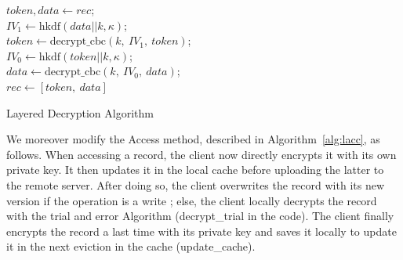 \documentclass[USenglish,oneside,twocolumn]{article}
\begin{document}
\vspace{-1.25cm}

\begin{algorithm}
\DontPrintSemicolon
{}
$token, data \gets rec$;\\
$IV_1 \gets \text{hkdf}(data || k, \kappa)$;\\
$token \gets \text{decrypt\_cbc}\left(k,\ IV_1,\ token \right )$;\\
$IV_0 \gets \text{hkdf}(token || k, \kappa)$;\\
$data \gets \text{decrypt\_cbc}\left(k,\ IV_0,\ data \right )$;\\
$rec \gets [token,\ data]$\\
\caption{Layered Decryption Algorithm}
\label{alg:ldecp}
\end{algorithm}

\vspace{-.5cm}

We moreover modify the Access method, described in Algorithm~\ref{alg:lacc}, as follows. When accessing a record, the client now directly encrypts it with its own private key. It then updates it in the local cache before uploading the latter to the remote server.
After doing so, the client overwrites the record with its new version if the operation is a write ; else, the client locally decrypts the record with the trial and error Algorithm (decrypt\_trial in the code). The client finally encrypts the record a last time with its private key and saves it locally to update it in the next eviction in the cache (update\_cache). \\
\end{document}
